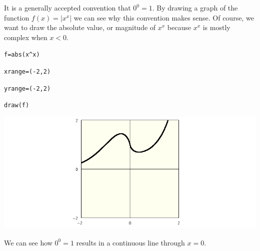\noindent
It is a generally accepted convention that $0^0=1$.
By drawing a graph of the function $f(x)=|x^x|$ we can see why this
convention makes sense.
Of course, we want to draw the absolute value, or magnitude of $x^x$ because
$x^x$ is mostly complex when $x<0$.

\medskip
\verb$f=abs(x^x)$

\verb$xrange=(-2,2)$

\verb$yrange=(-2,2)$

\verb$draw(f)$

\begin{center}
\includegraphics[scale=0.4]{zerozero.png}
\end{center}

\medskip
\noindent
We can see how $0^0=1$ results in a continuous line through $x=0$.

